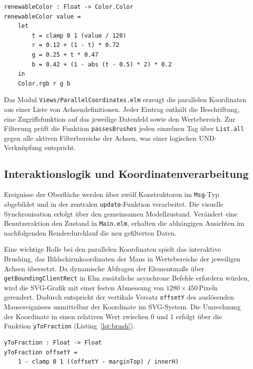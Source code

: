 \begin{lstlisting}[caption={Farbrampe der Heatmap: Begrenzung bei 120\,\% statt Kappen der Daten},label={lst:color}]
renewableColor : Float -> Color.Color
renewableColor value =
    let
        t = clamp 0 1 (value / 120)
        r = 0.12 + (1 - t) * 0.72
        g = 0.25 + t * 0.47
        b = 0.42 + (1 - abs (t - 0.5) * 2) * 0.2
    in
    Color.rgb r g b
\end{lstlisting}

Das Modul \texttt{Views/ParallelCoordinates.elm} erzeugt die parallelen Koordinaten aus einer Liste von Achsendefinitionen. Jeder Eintrag enthält die Beschriftung, eine Zugriffsfunktion auf das jeweilige Datenfeld sowie den Wertebereich. Zur Filterung prüft die Funktion \texttt{passesBrushes} jeden einzelnen Tag über \texttt{List.all} gegen alle aktiven Filterbereiche der Achsen, was einer logischen UND-Verknüpfung entspricht.

\subsection*{Interaktionslogik und Koordinatenverarbeitung}

Ereignisse der Oberfläche werden über zwölf Konstruktoren im \texttt{Msg}-Typ abgebildet und in der zentralen \texttt{update}-Funktion verarbeitet. Die visuelle Synchronisation erfolgt über den gemeinsamen Modellzustand. Verändert eine Benutzeraktion den Zustand in \texttt{Main.elm}, erhalten die abhängigen Ansichten im nachfolgenden Renderdurchlauf die neu gefilterten Daten.

Eine wichtige Rolle bei den parallelen Koordinaten spielt das interaktive Brushing, das Bildschirmkoordinaten der Maus in Wertebereiche der jeweiligen Achsen übersetzt. Da dynamische Abfragen der Elementmaße über \texttt{getBoundingClientRect} in Elm zusätzliche asynchrone Befehle erfordern würden, wird die SVG-Grafik mit einer festen Abmessung von $1280 \times 450$\,Pixeln gerendert. Dadurch entspricht der vertikale Versatz \texttt{offsetY} des auslösenden Mausereignisses unmittelbar der Koordinate im SVG-System. Die Umrechnung der Koordinate in einen relativen Wert zwischen 0 und 1 erfolgt über die Funktion \texttt{yToFraction} (Listing~\ref{lst:brush}).

\begin{lstlisting}[caption={Umrechnung der Mausposition in einen normierten Achsenwert},label={lst:brush}]
yToFraction : Float -> Float
yToFraction offsetY =
    1 - clamp 0 1 ((offsetY - marginTop) / innerH)
\end{lstlisting}

